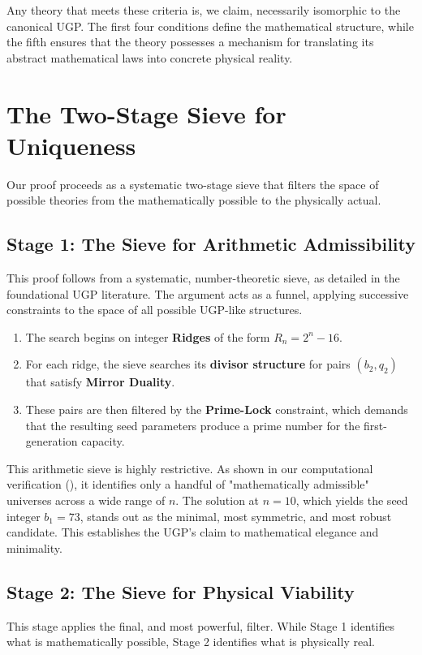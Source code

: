\documentclass[11pt,twocolumn]{article}
\theoremstyle{remark}
\begin{document}
Any theory that meets these criteria is, we claim, necessarily isomorphic to the canonical UGP. The first four conditions define the mathematical structure, while the fifth ensures that the theory possesses a mechanism for translating its abstract mathematical laws into concrete physical reality.

\section{The Two-Stage Sieve for Uniqueness}
Our proof proceeds as a systematic two-stage sieve that filters the space of possible theories from the mathematically possible to the physically actual.

\subsection{Stage 1: The Sieve for Arithmetic Admissibility}
This proof follows from a systematic, number-theoretic sieve, as detailed in the foundational UGP literature. The argument acts as a funnel, applying successive constraints to the space of all possible UGP-like structures.
\begin{enumerate}
    \item The search begins on integer \textbf{Ridges} of the form $R_n = 2^n - 16$.
    \item For each ridge, the sieve searches its \textbf{divisor structure} for pairs $(b_2, q_2)$ that satisfy \textbf{Mirror Duality}.
    \item These pairs are then filtered by the \textbf{Prime-Lock} constraint, which demands that the resulting seed parameters produce a prime number for the first-generation capacity.
\end{enumerate}
This arithmetic sieve is highly restrictive. As shown in our computational verification (), it identifies only a handful of "mathematically admissible" universes across a wide range of $n$. The solution at $n=10$, which yields the seed integer $b_1=73$, stands out as the minimal, most symmetric, and most robust candidate. This establishes the UGP's claim to mathematical elegance and minimality.

\subsection{Stage 2: The Sieve for Physical Viability}
This stage applies the final, and most powerful, filter. While Stage 1 identifies what is mathematically possible, Stage 2 identifies what is physically real.
\end{document}
